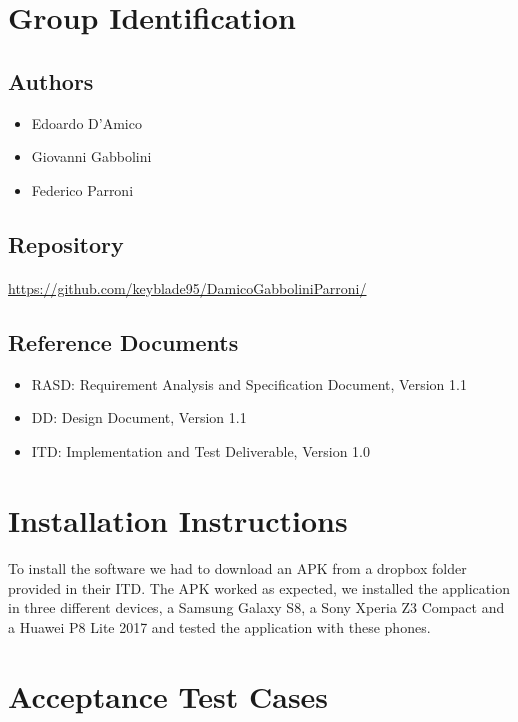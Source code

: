 \documentclass{article}
\begin{document}
	\section{Group Identification}
		\subsection{Authors}
		\begin{itemize}
			\item{} Edoardo D'Amico
			\item{} Giovanni Gabbolini
			\item{} Federico Parroni
		\end{itemize}
		\subsection{Repository}
		\paragraph{} \href{https://github.com/keyblade95/DamicoGabboliniParroni/}{https://github.com/keyblade95/DamicoGabboliniParroni/}
		\subsection{Reference Documents}
		\begin{itemize}
			\item{}RASD: Requirement Analysis and Specification Document, Version 1.1 
			\item{}DD: Design Document, Version 1.1
			\item{}ITD: Implementation and Test Deliverable, Version 1.0
		\end{itemize}
\newpage
	\section{Installation Instructions}
		\paragraph{} To install the software we had to download an APK from a dropbox folder provided in their ITD. The APK worked as expected, we installed the application in three different devices, a Samsung Galaxy S8, a Sony Xperia Z3 Compact and a Huawei P8 Lite 2017 and tested the application with these phones. 
\newpage
	\section{Acceptance Test Cases}
\end{document}
